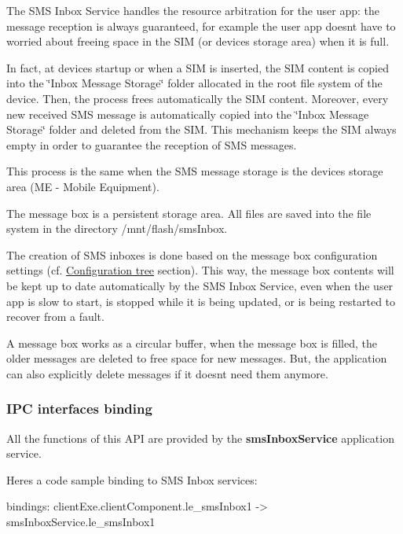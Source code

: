 The S\+M\+S Inbox Service handles the resource arbitration for the user app\+: the message reception is always guaranteed, for example the user app doesn\textquotesingle{}t have to worried about freeing space in the S\+I\+M (or device\textquotesingle{}s storage area) when it is full.

In fact, at device\textquotesingle{}s startup or when a S\+I\+M is inserted, the S\+I\+M content is copied into the \char`\"{}\+Inbox
\+Message Storage\char`\"{} folder allocated in the root file system of the device. Then, the process frees automatically the S\+I\+M content. Moreover, every new received S\+M\+S message is automatically copied into the \char`\"{}\+Inbox
\+Message Storage\char`\"{} folder and deleted from the S\+I\+M. This mechanism keeps the S\+I\+M always empty in order to guarantee the reception of S\+M\+S messages.

This process is the same when the S\+M\+S message storage is the device\textquotesingle{}s storage area (M\+E -\/ Mobile Equipment).

The message box is a persistent storage area. All files are saved into the file system in the directory /mnt/flash/sms\+Inbox.

The creation of S\+M\+S inboxes is done based on the message box configuration settings (cf. \hyperlink{c_sms_inbox_le_smsInbox_configdb}{Configuration tree} section). This way, the message box contents will be kept up to date automatically by the S\+M\+S Inbox Service, even when the user app is slow to start, is stopped while it is being updated, or is being restarted to recover from a fault.

A message box works as a circular buffer, when the message box is filled, the older messages are deleted to free space for new messages. But, the application can also explicitly delete messages if it doesn\textquotesingle{}t need them anymore.\hypertarget{c_sms_inbox_le_smsInbox_binding}{}\subsubsection{I\+P\+C interfaces binding}\label{c_sms_inbox_le_smsInbox_binding}
All the functions of this A\+P\+I are provided by the {\bfseries sms\+Inbox\+Service} application service.

Here\textquotesingle{}s a code sample binding to S\+M\+S Inbox services\+: \begin{DoxyVerb}bindings:
{
   clientExe.clientComponent.le_smsInbox1 -> smsInboxService.le_smsInbox1
}
\end{DoxyVerb}


